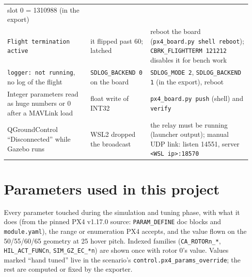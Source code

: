 \documentclass[11pt,a4paper]{article}
\newcommand{\file}[1]{\texttt{#1}}
\newcommand{\param}[1]{\texttt{#1}}
\begin{document}
\begin{longtable}{p{4.6cm}p{4.9cm}p{5.4cm}}
slot 0 = 1310988 (in the export) \\
\texttt{Flight termination active} & it flipped past 60\textdegree{}; latched & reboot the board
(\file{px4\_board.py shell reboot}); \param{CBRK\_FLIGHTTERM 121212} disables it for bench work \\
\texttt{logger: not running}, no log of the flight & \param{SDLOG\_BACKEND 0} on the board &
\param{SDLOG\_MODE 2}, \param{SDLOG\_BACKEND 1} (in the export), reboot \\
Integer parameters read as huge numbers or 0 after a MAVLink load & float write of INT32 &
\file{px4\_board.py push} (shell) and \file{verify} \\
QGroundControl ``Disconnected'' while Gazebo runs & WSL2 dropped the broadcast & the relay must be
running (launcher output); manual UDP link: listen 14551, server \texttt{<WSL ip>:18570} \\
\bottomrule
\end{longtable}

\section{Parameters used in this project}

Every parameter touched during the simulation and tuning phase, with what it does (from the
pinned PX4 v1.17.0 source: \file{PARAM\_DEFINE} doc blocks and \file{module.yaml}), the range or
enumeration PX4 accepts, and the value flown on the 50/55/60/65 geometry at 25\textdegree{} hover
pitch. Indexed families (\param{CA\_ROTORn\_*}, \param{HIL\_ACT\_FUNCn}, \param{SIM\_GZ\_EC\_*n})
are shown once with rotor 0's value. Values marked ``hand tuned'' live in the scenario's
\param{control.px4\_params\_override}; the rest are computed or fixed by the exporter.
\end{document}
